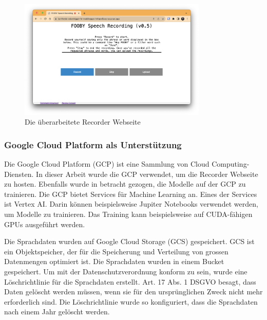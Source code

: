 \documentclass[11pt,a4paper]{article}
\begin{document}
\begin{figure}[h]
    \centering
    \includegraphics[width=0.8\textwidth]{img/ba-recorder-website.png} 
    \caption{Die überarbeitete Recorder Webseite}
    \label{fig:recorder_webseite}
\end{figure}

\subsubsection{Google Cloud Platform als Unterstützung}
Die Google Cloud Platform (GCP) ist eine Sammlung von Cloud Computing-Diensten. In dieser Arbeit
wurde die GCP verwendet, um die Recorder Webseite zu hosten. Ebenfalls wurde in betracht gezogen,
die Modelle auf der GCP zu trainieren. Die GCP bietet Services für Machine Learning an. Eines der
Services ist Vertex AI. Darin können beispielsweise Jupiter Notebooks verwendet werden, um Modelle
zu trainieren. Das Training kann beispielsweise auf CUDA-fähigen GPUs ausgeführt werden.

\noindent \newline
Die Sprachdaten wurden auf Google Cloud Storage (GCS) gespeichert. GCS ist ein Objektspeicher, der
für die Speicherung und Verteilung von grossen Datenmengen optimiert ist. Die Sprachdaten wurden
in einem Bucket gespeichert. Um mit der Datenschutzverordnung konform zu sein, wurde eine 
Löschrichtlinie für die Sprachdaten erstellt. Art. 17 Abs. 1 DSGVO besagt, dass Daten gelöscht 
werden müssen, wenn sie für den ursprünglichen Zweck nicht mehr erforderlich sind. Die
Löschrichtlinie wurde so konfiguriert, dass die Sprachdaten nach einem Jahr gelöscht werden.
\end{document}
